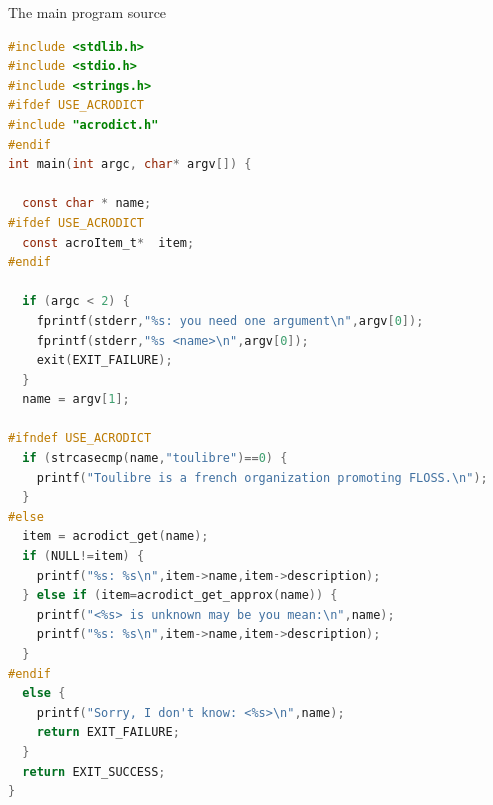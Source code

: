 \documentclass[compress,slidestop,table
              ]
               {beamer}
\begin{document}
\begin{frame}[fragile]
\setlength{\columnsep}{0.8cm}
\vspace*{-0.5cm}
\begin{center}
The main program source
\end{center}
\begin{multicols}{2}
\begin{lstlisting}[basicstyle=\tiny,language=C,breaklines=true]
#include <stdlib.h>
#include <stdio.h>
#include <strings.h>
#ifdef USE_ACRODICT
#include "acrodict.h"
#endif
int main(int argc, char* argv[]) {

  const char * name;
#ifdef USE_ACRODICT
  const acroItem_t*  item;
#endif

  if (argc < 2) {
    fprintf(stderr,"%s: you need one argument\n",argv[0]);
    fprintf(stderr,"%s <name>\n",argv[0]);
    exit(EXIT_FAILURE);
  }
  name = argv[1];

#ifndef USE_ACRODICT
  if (strcasecmp(name,"toulibre")==0) {
    printf("Toulibre is a french organization promoting FLOSS.\n");
  }
#else
  item = acrodict_get(name);
  if (NULL!=item) {
    printf("%s: %s\n",item->name,item->description);
  } else if (item=acrodict_get_approx(name)) {
    printf("<%s> is unknown may be you mean:\n",name);
    printf("%s: %s\n",item->name,item->description);
  }
#endif
  else {
    printf("Sorry, I don't know: <%s>\n",name);
    return EXIT_FAILURE;
  }
  return EXIT_SUCCESS;
}
\end{lstlisting}
\end{multicols}
\end{frame}
\end{document}
